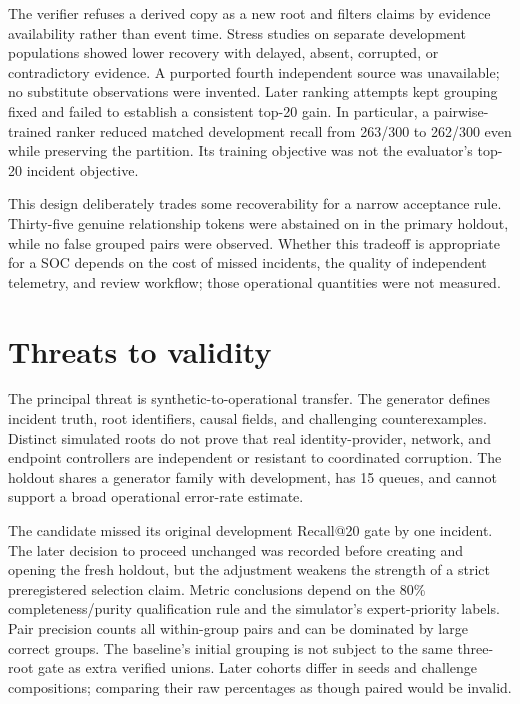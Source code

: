 The verifier refuses a derived copy as a new root and filters claims by evidence availability rather than event time. Stress studies on separate development populations showed lower recovery with delayed, absent, corrupted, or contradictory evidence. A purported fourth independent source was unavailable; no substitute observations were invented. Later ranking attempts kept grouping fixed and failed to establish a consistent top-20 gain. In particular, a pairwise-trained ranker reduced matched development recall from 263/300 to 262/300 even while preserving the partition. Its training objective was not the evaluator's top-20 incident objective.

This design deliberately trades some recoverability for a narrow acceptance rule. Thirty-five genuine relationship tokens were abstained on in the primary holdout, while no false grouped pairs were observed. Whether this tradeoff is appropriate for a SOC depends on the cost of missed incidents, the quality of independent telemetry, and review workflow; those operational quantities were not measured.



\section{Threats to validity}
The principal threat is synthetic-to-operational transfer. The generator defines incident truth, root identifiers, causal fields, and challenging counterexamples. Distinct simulated roots do not prove that real identity-provider, network, and endpoint controllers are independent or resistant to coordinated corruption. The holdout shares a generator family with development, has 15 queues, and cannot support a broad operational error-rate estimate.

The candidate missed its original development Recall@20 gate by one incident. The later decision to proceed unchanged was recorded before creating and opening the fresh holdout, but the adjustment weakens the strength of a strict preregistered selection claim. Metric conclusions depend on the 80\% completeness/purity qualification rule and the simulator's expert-priority labels. Pair precision counts all within-group pairs and can be dominated by large correct groups. The baseline's initial grouping is not subject to the same three-root gate as extra verified unions. Later cohorts differ in seeds and challenge compositions; comparing their raw percentages as though paired would be invalid.

